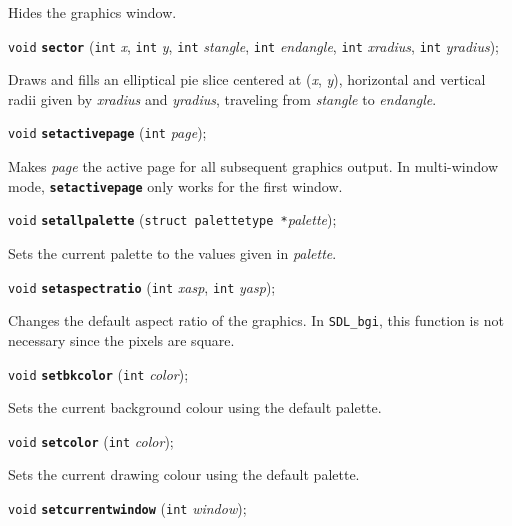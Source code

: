 \documentclass[a4paper,11pt]{article}
\newcommand{\SDLbgi}{\texttt{SDL\_bgi}}
\newcommand{\V}{\texttt{void}}      %
\newcommand{\I}{\texttt{int}}       %
\newcommand{\func}[1]{\textbf{\texttt{#1}}}  %
\newcommand{\A}[1]{\emph{#1}}       %
\newenvironment{bgi}
{ %
  \begin{snugshade}
}
{ %
  \end{snugshade}
}
\begin{document}
Hides the graphics window.


\begin{bgi}
\V{} \func{sector} (\I{} \A{x}, \I{} \A{y}, \I{} \A{stangle}, \I{}
\A{endangle}, \I{} \A{xradius}, \I{} \A{yradius});
\end{bgi}

Draws and fills an elliptical pie slice centered at (\A{x}, \A{y}),
horizontal and vertical radii given by \A{xradius} and \A{yradius},
traveling from \A{stangle} to \A{endangle}.


\begin{bgi}
\V{} \func{setactivepage} (\I{} \A{page});
\end{bgi}

Makes \A{page} the active page for all subsequent graphics output. In
multi-window mode, \func{setactivepage} only works for the first window.


\begin{bgi}
\V{} \func{setallpalette} (\texttt{struct palettetype *}\A{palette}); 
\end{bgi}

Sets the current palette to the values given in \A{palette}.


\begin{bgi}
\V{} \func{setaspectratio} (\I{} \A{xasp}, \I{} \A{yasp});
\end{bgi}

Changes the default aspect ratio of the graphics. In \SDLbgi, this
function is not necessary since the pixels are square.


\begin{bgi}
\V{} \func{setbkcolor} (\I{} \A{color});
\end{bgi}

Sets the current background colour using the default palette.


\begin{bgi}
\V{} \func{setcolor} (\I{} \A{color});
\end{bgi}

Sets the current drawing colour using the default palette.


\begin{bgi}
\V{} \func{setcurrentwindow} (\I{} \A{window});
\end{bgi}
\end{document}
